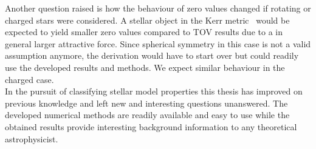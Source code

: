 Another question raised is how the behaviour of zero values changed if rotating or charged stars were considered.
A stellar object in the Kerr metric~\cite{kerrGravitationalFieldSpinning1963} would be expected to yield smaller zero values compared to \ac{TOV} results due to a in general larger attractive force.
Since spherical symmetry in this case is not a valid assumption anymore, the derivation would have to start over but could readily use the developed results and methods.
We expect similar behaviour in the charged case.\\
In the pursuit of classifying stellar model properties this thesis has improved on previous knowledge and left new and interesting questions unanswered.
The developed numerical methods are readily available and easy to use while the obtained results provide interesting background information to any theoretical astrophysicist.
